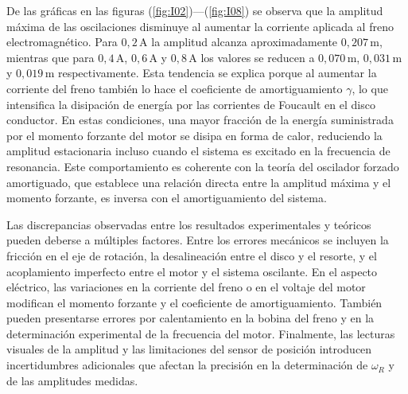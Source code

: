 De las gr\'aficas en las figuras (\ref{fig:I02})---(\ref{fig:I08}) se observa que 
la amplitud m\'axima de las oscilaciones disminuye al aumentar la corriente 
aplicada al freno electromagn\'etico. Para \(0{,}2\,\text{A}\) la amplitud 
alcanza aproximadamente \(0{,}207\,\text{m}\), mientras que para 
\(0{,}4\,\text{A}\), \(0{,}6\,\text{A}\) y \(0{,}8\,\text{A}\) los valores se 
reducen a \(0{,}070\,\text{m}\), \(0{,}031\,\text{m}\) y \(0{,}019\,\text{m}\) 
respectivamente. Esta tendencia se explica porque al aumentar la corriente del 
freno tambi\'en lo hace el coeficiente de amortiguamiento \(\gamma\), lo que 
intensifica la disipaci\'on de energ\'ia por las corrientes de Foucault en el 
disco conductor. En estas condiciones, una mayor fracci\'on de la energ\'ia 
suministrada por el momento forzante del motor se disipa en forma de calor, 
reduciendo la amplitud estacionaria incluso cuando el sistema es excitado en la 
frecuencia de resonancia. Este comportamiento es coherente con la teor\'ia del 
oscilador forzado amortiguado, que establece una relaci\'on directa entre la 
amplitud m\'axima y el momento forzante, es inversa con el amortiguamiento del 
sistema.

Las discrepancias observadas entre los resultados experimentales y te\'oricos 
pueden deberse a m\'ultiples factores. Entre los errores mec\'anicos se incluyen 
la fricci\'on en el eje de rotaci\'on, la desalineaci\'on entre el disco y el 
resorte, y el acoplamiento imperfecto entre el motor y el sistema oscilante. En 
el aspecto el\'ectrico, las variaciones en la corriente del freno o en el 
voltaje del motor modifican el momento forzante y el coeficiente de 
amortiguamiento. Tambi\'en pueden presentarse errores por calentamiento en la 
bobina del freno y en la determinaci\'on experimental de la frecuencia del 
motor. Finalmente, las lecturas visuales de la amplitud y las limitaciones del 
sensor de posici\'on introducen incertidumbres adicionales que afectan la 
precisi\'on en la determinaci\'on de \(\omega_R\) y de las amplitudes medidas.
